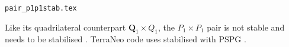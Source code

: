 \begin{flushright} {\tiny {\color{gray} \tt  pair\_p1p1stab.tex}} \end{flushright}

Like its quadrilateral counterpart ${\bm Q}_1\times Q_1$, the 
$P_1\times P_1$ pair is not stable and needs to be stabilised \cite{nosi98,tasu00}.
TerraNeo code uses stabilised with PSPG \cite{babd20}.

\textcite{nosi98}
